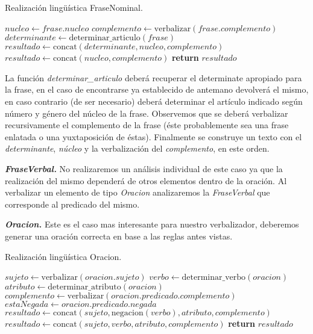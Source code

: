 \begin{algorithm}[H]
\caption{Realización lingüística FraseNominal.}
\begin{algorithmic}[1]
\State $nucleo\gets frase.nucleo$
\State $complemento\gets \text{verbalizar}(frase.complemento)$
\State $determinante\gets \text{determinar\_articulo}(frase)$
\State $resultado\gets \text{concat}(determinante, nucleo, complemento)$
\Else
\State $resultado\gets \text{concat}(nucleo, complemento)$
\EndIf
\Statex
\State \textbf{return} $resultado$
\EndFunction
\end{algorithmic}
\end{algorithm}

\noindent
La función \emph{determinar\_articulo} deberá recuperar el determinate apropiado para la frase, en el caso de encontrarse ya establecido de antemano devolverá el mismo, en caso contrario (de ser necesario) deberá determinar el artículo indicado según número y género del núcleo de la frase. Observemos que se deberá verbalizar recursivamente el complemento de la frase (éste probablemente sea una frase enlatada o una yuxtaposición de éstas). Finalmente se construye un texto con el \emph{determinante}, \emph{núcleo} y la verbalización del \emph{complemento}, en este orden.

\medskip
\noindent
\textbf{\emph{FraseVerbal.}} No realizaremos un análisis individual de este caso ya que la realización del mismo dependerá de otros elementos dentro de la oración. Al verbalizar un elemento de tipo \emph{Oracion} analizaremos la \emph{FraseVerbal} que corresponde al predicado del mismo.


\medskip
\noindent
\textbf{\emph{Oracion.}} Este es el caso mas interesante para nuestro verbalizador, deberemos generar una oración correcta en base a las reglas antes vistas. 

\begin{algorithm}[H]
\caption{Realización lingüística Oracion.}
\begin{algorithmic}[1]
\State $sujeto\gets \text{verbalizar}(oracion.sujeto)$
\State $verbo\gets \text{determinar\_verbo}(oracion)$
\State $atributo\gets \text{determinar\_atributo}(oracion)$
\State $complemento\gets \text{verbalizar}(oracion.predicado.complemento)$
\State $estaNegada\gets oracion.predicado.negada$
\Statex
{}
\State $resultado\gets \text{concat}(sujeto, \text{negacion}(verbo), atributo, complemento)$
\Else
\State $resultado\gets \text{concat}(sujeto, verbo, atributo, complemento)$
\EndIf
\Statex
\State \textbf{return} $resultado$
\EndFunction
\end{algorithmic}
\end{algorithm}

